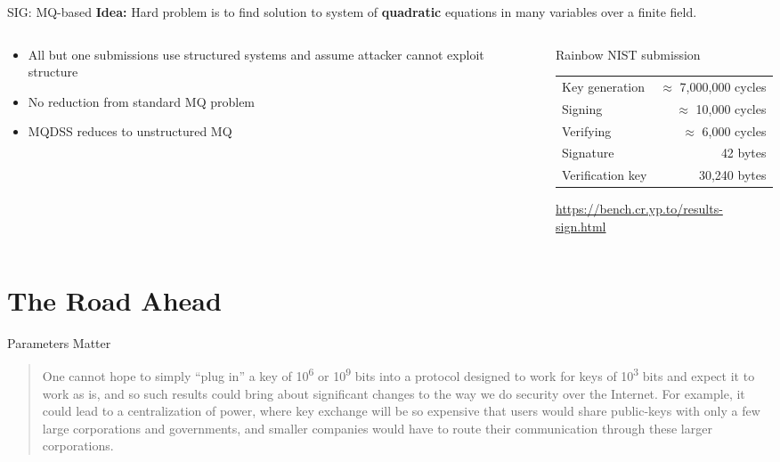 \documentclass[xcolor=table,10pt,aspectratio=169]{beamer}
\begin{document}
\begin{frame}[label={sec:org82c4a85}]{SIG: MQ-based}
\textbf{Idea:} Hard problem is to find solution to system of \textbf{quadratic} equations in many variables over a finite field.

\begin{columns}[t]
\begin{column}{0.5\columnwidth}
\begin{itemize}
\item All but one submissions use structured systems and assume attacker cannot exploit structure
\item No reduction from standard MQ problem
\item MQDSS reduces to unstructured MQ
\end{itemize}
\end{column}

\begin{column}{0.5\columnwidth}
Rainbow NIST submission

\begin{center}
\begin{tabular}{lr}
Key generation & \(\approx\) 7,000,000 cycles\\
Signing & \(\approx\)    10,000 cycles\\
Verifying & \(\approx\)     6,000 cycles\\
Signature & 42 bytes\\
Verification key & 30,240 bytes\\
\end{tabular}

\end{center}

\small \url{https://bench.cr.yp.to/results-sign.html}
\end{column}
\end{columns}
\end{frame}

\section{The Road Ahead}
\label{sec:org967212d}
\begin{frame}[label={sec:orga903856}]{Parameters Matter}
\begin{quote}
One cannot hope to simply “plug in” a key of 10\textsuperscript{6} or 10\textsuperscript{9} bits into a protocol designed to work for keys of 10\textsuperscript{3} bits and expect it to work as is, and so such results could bring about significant changes to the way we do security over the Internet.  For example, it could lead to a centralization of power, where key exchange will be so expensive that users would share public-keys with only a few large corporations and governments, and smaller companies would have to route their communication through these larger corporations. 
\end{quote}
\end{frame}
\end{document}
